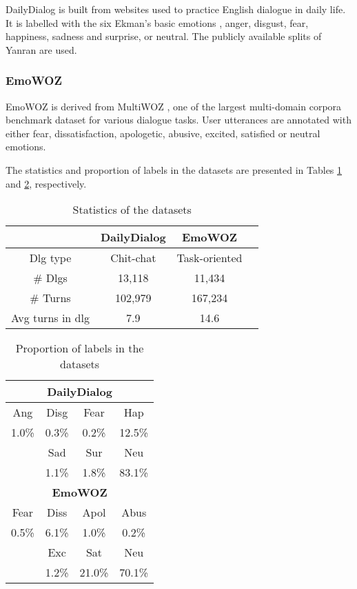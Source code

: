 \documentclass[11pt]{article}
\begin{document}
DailyDialog is built from websites used to practice English dialogue in daily life. It is labelled with the six Ekman’s basic emotions \cite{ekman1999basic}, anger, disgust, fear, happiness, sadness and surprise, or neutral. The publicly available splits of Yanran are used.  


\subsubsection{EmoWOZ}


EmoWOZ is derived from MultiWOZ \cite{budzianowski-etal-2018-multiwoz}, one of the largest multi-domain corpora benchmark dataset for various dialogue tasks. User utterances are annotated with either fear, dissatisfaction, apologetic, abusive, excited, satisfied or neutral emotions. 


The statistics and proportion of labels in the  datasets are presented in Tables \ref{t0} and \ref{t1}, respectively.



\begin{table}[H]
  \caption{Statistics of the datasets}
 \centering
  \begin{tabular}{cccc}
    \hline
   &  \textbf{DailyDialog} &\textbf{EmoWOZ}  \\
    \hline
    Dlg type & Chit-chat &Task-oriented  \\
    \# Dlgs &13,118&  11,434 \\
    \# Turns &102,979& 167,234 \\
     Avg turns in dlg &7.9&14.6 \\


    \hline
  \end{tabular} 
 \label{t0}
\end{table}






\begin{table}[H]
  \caption{Proportion of labels in the datasets}
 \centering
  \begin{tabular}{cccc}
    \hline
      \multicolumn{4}{c}{\textbf{DailyDialog}}   \\
       \hline
  Ang & Disg & Fear & Hap \\
   
   1.0\%&0.3\%& 0.2\%& 12.5\% \\
    
  & Sad & Sur & Neu \\

  &1.1\%& 1.8\%&83.1\% \\
    \hline
     \multicolumn{4}{c}{\textbf{EmoWOZ}}   \\
      \hline
      Fear & Diss & Apol & Abus \\ 
  
   0.5\%&6.1\%& 1.0\%& 0.2\%  \\
   
  
   & Exc & Sat & Neu \\
  &1.2\%& 21.0\%&70.1\% \\
    \hline
  \end{tabular} 
 \label{t1}
\end{table}
\end{document}
